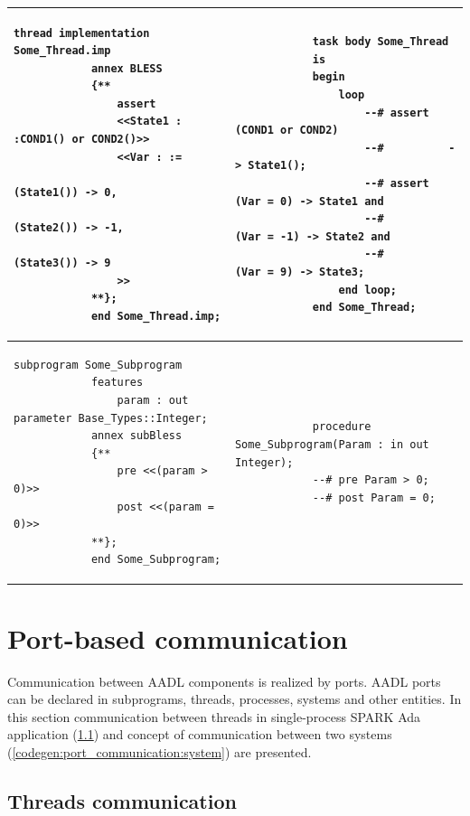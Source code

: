 \begin{center}
\begin{longtable}{| p{3in} | p{3in} |}
		\\ \hline

		\begin{lstlisting}[language=bless]
			thread implementation Some_Thread.imp
			annex BLESS 
			{**
				assert
				<<State1 : :COND1() or COND2()>>
				<<Var : :=
  								(State1()) -> 0,
  								(State2()) -> -1,
  								(State3()) -> 9
				>>
			**};
			end Some_Thread.imp;
		\end{lstlisting} 
		& 
		\begin{lstlisting}
			task body Some_Thread
			is
			begin
				loop
					--# assert (COND1 or COND2)
					--#          -> State1();
					--# assert (Var = 0) -> State1 and
					--#        (Var = -1) -> State2 and
					--#        (Var = 9) -> State3;
				end loop;
			end Some_Thread;
		\end{lstlisting} 

		\\ \hline

		\begin{lstlisting}[language=bless]
			subprogram Some_Subprogram
			features 
				param : out parameter Base_Types::Integer;
			annex subBless
			{**
				pre <<(param > 0)>>
				post <<(param = 0)>>
			**};
			end Some_Subprogram;
		\end{lstlisting} 
		& 
		\begin{lstlisting}
			procedure Some_Subprogram(Param : in out Integer);
		    --# pre Param > 0;
		    --# post Param = 0;
		\end{lstlisting} 
		
	\end{longtable}
\end{center}
\doublespacing


\section{Port-based communication}
\label{codegen:port_communication}

Communication between AADL components is realized by ports. AADL ports can be declared in subprograms, threads, processes, systems and other entities. In this section communication between threads in single-process SPARK Ada application (\ref{codegen:port_communication:thread}) and concept of communication between two systems (\ref{codegen:port_communication:system}) are presented. 


\subsection{Threads communication}
\label{codegen:port_communication:thread}

